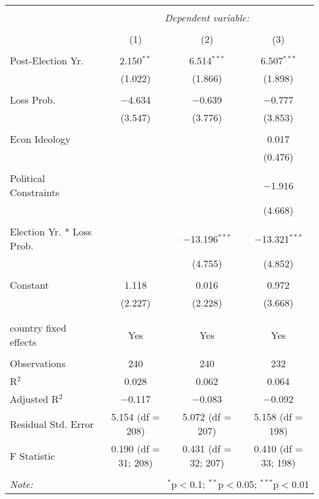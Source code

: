 
\begingroup 
\footnotesize 
\begin{tabular}{@{\extracolsep{5pt}}lccc} 
\\[-1.8ex]\hline 
\hline \\[-1.8ex] 
 & \multicolumn{3}{c}{\textit{Dependent variable:}} \\ 
\cline{2-4} 
\\[-1.8ex] & (1) & (2) & (3)\\ 
\hline \\[-1.8ex] 
 Post-Election Yr. & 2.150$^{**}$ & 6.514$^{***}$ & 6.507$^{***}$ \\ 
  & (1.022) & (1.866) & (1.898) \\ 
  & & & \\ 
 Loss Prob. & $-$4.634 & $-$0.639 & $-$0.777 \\ 
  & (3.547) & (3.776) & (3.853) \\ 
  & & & \\ 
 Econ Ideology &  &  & 0.017 \\ 
  &  &  & (0.476) \\ 
  & & & \\ 
 Political Constraints &  &  & $-$1.916 \\ 
  &  &  & (4.668) \\ 
  & & & \\ 
 Election Yr. * Loss Prob. &  & $-$13.196$^{***}$ & $-$13.321$^{***}$ \\ 
  &  & (4.755) & (4.852) \\ 
  & & & \\ 
 Constant & 1.118 & 0.016 & 0.972 \\ 
  & (2.227) & (2.228) & (3.668) \\ 
  & & & \\ 
\hline \\[-1.8ex] 
country fixed effects & Yes & Yes & Yes \\ 
\hline \\[-1.8ex] 
Observations & 240 & 240 & 232 \\ 
R$^{2}$ & 0.028 & 0.062 & 0.064 \\ 
Adjusted R$^{2}$ & $-$0.117 & $-$0.083 & $-$0.092 \\ 
Residual Std. Error & 5.154 (df = 208) & 5.072 (df = 207) & 5.158 (df = 198) \\ 
F Statistic & 0.190 (df = 31; 208) & 0.431 (df = 32; 207) & 0.410 (df = 33; 198) \\ 
\hline 
\hline \\[-1.8ex] 
\textit{Note:}  & \multicolumn{3}{r}{$^{*}$p$<$0.1; $^{**}$p$<$0.05; $^{***}$p$<$0.01} \\ 
\end{tabular} 
\endgroup 
